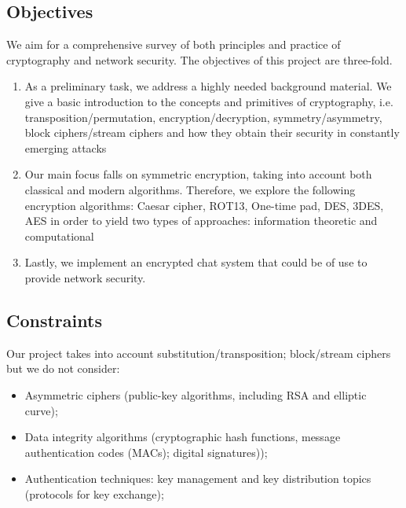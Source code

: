 \subsection{Objectives}
We aim for a comprehensive survey of both principles and practice of cryptography and network security. The objectives of this project are three-fold. 
\begin{enumerate}
\item  As a preliminary task, we address a highly needed background material. We give a basic introduction to the concepts and primitives of cryptography, i.e. transposition/permutation, encryption/decryption, symmetry/asymmetry, block ciphers/stream ciphers and how they obtain their security in constantly emerging attacks
\item  Our main focus falls on symmetric encryption, taking into account both classical and modern algorithms. Therefore,  we explore the following encryption algorithms: Caesar cipher, ROT13, One-time pad, DES, 3DES, AES in order to yield two types of approaches: information theoretic and computational
\item Lastly, we implement an encrypted chat system that could be of use to provide network security.
\end{enumerate}


\subsection{Constraints}
Our project takes into account substitution/transposition; block/stream ciphers but we do not consider:
\begin{itemize}
\item Asymmetric ciphers (public-key algorithms, including RSA and elliptic curve); 
\end{itemize}
\begin{itemize}
\item Data integrity algorithms (cryptographic hash functions, message authentication codes (MACs); digital signatures)); 
\end{itemize}
\begin{itemize}
\item Authentication techniques: key management and key distribution topics (protocols for key exchange);
\end{itemize}


